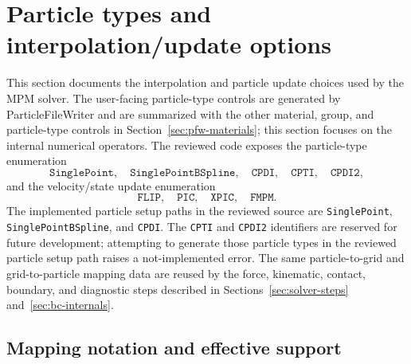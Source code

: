 \section{Particle types and interpolation/update options}
\label{sec:particle-types-and-mapping}

This section documents the interpolation and particle update choices used by the MPM solver.  The user-facing particle-type controls are generated by ParticleFileWriter and are summarized with the other material, group, and particle-type controls in Section~\ref{sec:pfw-materials}; this section focuses on the internal numerical operators.  The reviewed code exposes the particle-type enumeration
\begin{equation}
  \texttt{SinglePoint},\quad
  \texttt{SinglePointBSpline},\quad
  \texttt{CPDI},\quad
  \texttt{CPTI},\quad
  \texttt{CPDI2},
\end{equation}
and the velocity/state update enumeration
\begin{equation}
  \texttt{FLIP},\quad \texttt{PIC},\quad \texttt{XPIC},\quad \texttt{FMPM}.
\end{equation}
The implemented particle setup paths in the reviewed source are \texttt{SinglePoint}, \texttt{SinglePointBSpline}, and \texttt{CPDI}.  The \texttt{CPTI} and \texttt{CPDI2} identifiers are reserved for future development; attempting to generate those particle types in the reviewed particle setup path raises a not-implemented error.  The same particle-to-grid and grid-to-particle mapping data are reused by the force, kinematic, contact, boundary, and diagnostic steps described in Sections~\ref{sec:solver-steps} and~\ref{sec:bc-internals}.

\subsection{Mapping notation and effective support}
\label{subsec:mapping-notation}

